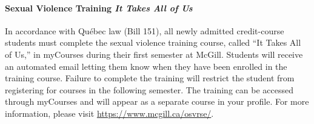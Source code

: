 
\paragraph{Sexual Violence Training {\em It Takes All of Us}}

In accordance with Québec law (Bill 151), all newly admitted
credit-course students must complete the sexual violence training
course, called ``It Takes All of Us,'' in myCourses during their first
semester at McGill. Students will receive an automated email letting
them know when they have been enrolled in the training course. Failure
to complete the training will restrict the student from registering
for courses in the following semester. The training can be accessed
through myCourses and will appear as a separate course in your
profile. For more information, please visit
\url{https://www.mcgill.ca/osvrse/}.
